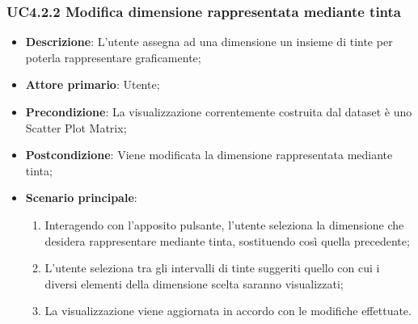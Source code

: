 \subsubsection{UC4.2.2 Modifica dimensione rappresentata mediante tinta}
\label{ssub:uc4.2.2}
\begin{itemize}
    
    \item \textbf{Descrizione}:     L'utente assegna ad una dimensione un insieme di tinte per poterla rappresentare 
                                    graficamente;
    
    \item \textbf{Attore primario}: Utente;
    \item \textbf{Precondizione}:   La visualizzazione correntemente costruita dal dataset è uno Scatter Plot Matrix;
    \item \textbf{Postcondizione}:  Viene modificata la dimensione rappresentata mediante tinta;
    \item \textbf{Scenario principale}:
    \begin{enumerate}
        
        \item   Interagendo con l'apposito pulsante, l'utente seleziona la dimensione che desidera rappresentare 
                mediante tinta, sostituendo così quella precedente;

        \item   L'utente seleziona tra gli intervalli di tinte suggeriti quello con cui i diversi elementi della 
                dimensione scelta saranno visualizzati;
        
        \item   La visualizzazione viene aggiornata in accordo con le modifiche effettuate.
    \end{enumerate}
\end{itemize}

